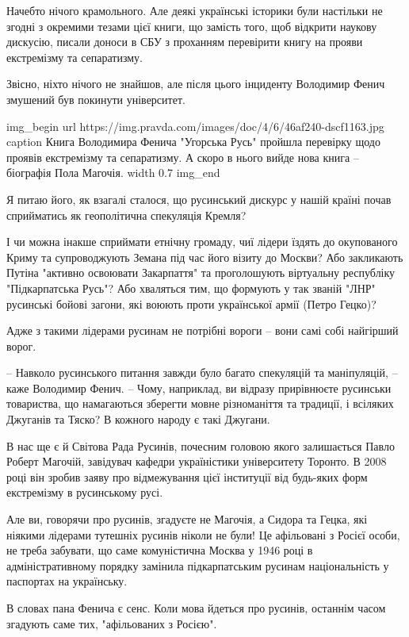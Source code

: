 Начебто нічого крамольного. Але деякі українські історики були настільки не
згодні з окремими тезами цієї книги, що замість того, щоб відкрити наукову
дискусію, писали доноси в СБУ з проханням перевірити книгу на прояви
екстремізму та сепаратизму.

Звісно, ніхто нічого не знайшов, але після цього інциденту Володимир Фенич
змушений був покинути університет.

\ifcmt
img_begin 
	url https://img.pravda.com/images/doc/4/6/46af240-dscf1163.jpg
	caption Книга Володимира Фенича "Угорська Русь" пройшла перевірку щодо проявів екстремізму та сепаратизму. А скоро в нього вийде нова книга – біографія Пола Магочія.
    width 0.7
img_end
\fi

Я питаю його, як взагалі сталося, що русинський дискурс у нашій країні почав
сприйматись як геополітична спекуляція Кремля?

І чи можна інакше сприймати етнічну громаду, чиї лідери їздять до окупованого
Криму та супроводжують Земана під час його візиту до Москви? Або закликають
Путіна "активно освоювати Закарпаття" та проголошують віртуальну республіку
"Підкарпатська Русь"? Або хваляться тим, що формують у так званій "ЛНР"
русинські бойові загони, які воюють проти української армії (Петро Гецко)?

Адже з такими лідерами русинам не потрібні вороги – вони самі собі найгірший
ворог.

– Навколо русинського питання завжди було багато спекуляцій та маніпуляцій, –
каже Володимир Фенич. – Чому, наприклад, ви відразу прирівнюєте русинськи
товариства, що намагаються зберегти мовне різноманіття та традиції, і всіляких
Джуганів та Тяско? В кожного народу є такі Джугани.

В нас ще є й Світова Рада Русинів, почесним головою якого залишається Павло
Роберт Магочій, завідувач кафедри україністики університету Торонто. В 2008
році він зробив заяву про відмежування цієї інституції від будь-яких форм
екстремізму в русинському русі.

Але ви, говорячи про русинів, згадуєте не Магочія, а Сидора та Гецка, які
ніякими лідерами тутешніх русинів ніколи не були! Це афільовані з Росієї особи,
не треба забувати, що саме комуністична Москва у 1946 році в адміністративному
порядку замінила підкарпатським русинам національність у паспортах на
українську.

В словах пана Фенича є сенс. Коли мова йдеться про русинів, останнім часом
згадують саме тих, "афільованих з Росією".

